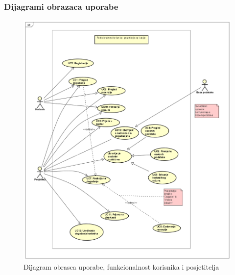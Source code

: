 					
					
				\eject	
				
					
				\subsubsection{Dijagrami obrazaca uporabe}
					
					
					\begin{figure}[H]
						\includegraphics[width=\textwidth]{slike/UCD1-1.PNG}
						\caption{Dijagram obrasca uporabe, funkcionalnost korisnika i posjetitelja}
						\label{fig:UCD1}
					\end{figure}
					
